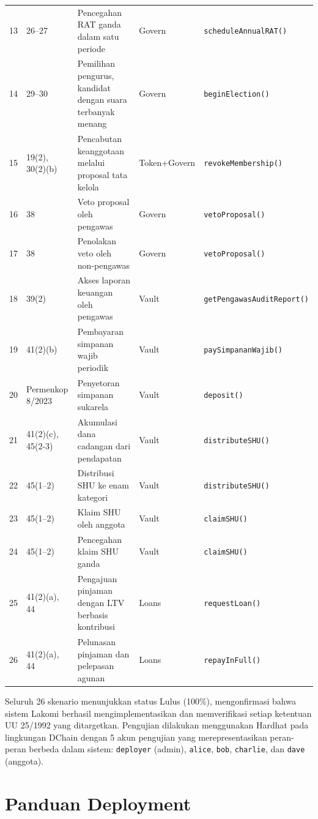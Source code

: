 \begin{table}[H]
{\begin{tabular}{p{}p{}p{}p{}p{}}
13 & 26--27 & Pencegahan RAT ganda dalam satu periode & Govern & \texttt{scheduleAnnualRAT()} \\
14 & 29--30 & Pemilihan pengurus, kandidat dengan suara terbanyak menang & Govern & \texttt{beginElection()} \\
15 & 19(2), 30(2)(b) & Pencabutan keanggotaan melalui proposal tata kelola & Token+Govern & \texttt{revokeMembership()} \\
16 & 38 & Veto proposal oleh pengawas & Govern & \texttt{vetoProposal()} \\
17 & 38 & Penolakan veto oleh non-pengawas & Govern & \texttt{vetoProposal()} \\
18 & 39(2) & Akses laporan keuangan oleh pengawas & Vault & \texttt{getPengawasAuditReport()} \\
19 & 41(2)(b) & Pembayaran simpanan wajib periodik & Vault & \texttt{paySimpananWajib()} \\
20 & Permenkop 8/2023 & Penyetoran simpanan sukarela & Vault & \texttt{deposit()} \\
21 & 41(2)(c), 45(2-3) & Akumulasi dana cadangan dari pendapatan & Vault & \texttt{distributeSHU()} \\
22 & 45(1--2) & Distribusi SHU ke enam kategori & Vault & \texttt{distributeSHU()} \\
23 & 45(1--2) & Klaim SHU oleh anggota & Vault & \texttt{claimSHU()} \\
24 & 45(1--2) & Pencegahan klaim SHU ganda & Vault & \texttt{claimSHU()} \\
25 & 41(2)(a), 44 & Pengajuan pinjaman dengan LTV berbasis kontribusi & Loans & \texttt{requestLoan()} \\
26 & 41(2)(a), 44 & Pelunasan pinjaman dan pelepasan agunan & Loans & \texttt{repayInFull()} \\
\bottomrule
\end{tabular}}
\end{table}

Seluruh 26 skenario menunjukkan status Lulus (100\%), mengonfirmasi bahwa sistem Lakomi berhasil mengimplementasikan dan memverifikasi setiap ketentuan UU 25/1992 yang ditargetkan. Pengujian dilakukan menggunakan Hardhat pada lingkungan DChain dengan 5 akun pengujian yang merepresentasikan peran-peran berbeda dalam sistem: \texttt{deployer} (admin), \texttt{alice}, \texttt{bob}, \texttt{charlie}, dan \texttt{dave} (anggota).

\section{Panduan Deployment}


